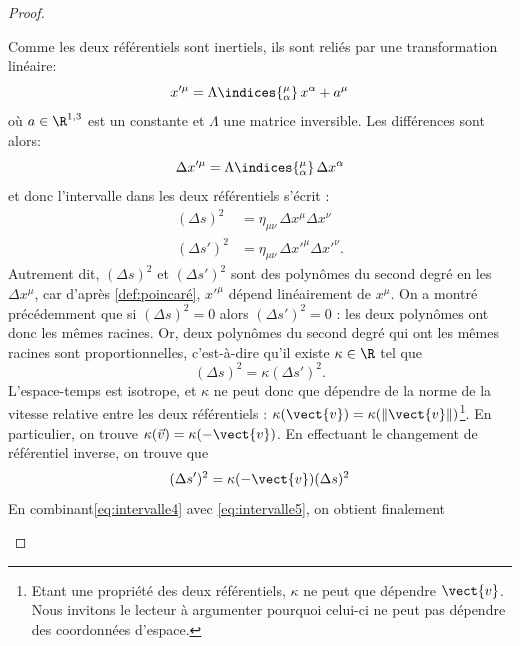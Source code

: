 {\begin{proof}
\begin{enumerate}
        Comme les deux référentiels sont inertiels, ils sont reliés par une transformation linéaire: 
        \begin{equation}
            x'^{\mu} = \Lambda\indices{^\mu_\alpha} \, x^{\alpha} + a^{\mu}
            \label{def:poincaré}
        \end{equation}
        où $a\in \R^{1,3}$ est un constante et $\Lambda$ une matrice inversible. Les différences sont alors:
        \begin{equation}
            \label{eq:intervalle1}
            \Delta x'^{\mu} = \Lambda\indices{^{\mu}_{\alpha}} \,  \Delta x^{\alpha}
        \end{equation}
        et donc l'intervalle dans les deux référentiels s'écrit : 
        \begin{align}
            \label{eq:intervalle2}
            (\Delta s)^2 & = \eta _{\mu \nu} \, \Delta x^{\mu} \Delta x^{\nu}\\
            \label{eq:intervalle3}
            (\Delta s')^2 & = \eta _{\mu \nu} \, \Delta x'^{\mu} \Delta x'^{\nu}.
        \end{align}
        Autrement dit, $(\Delta s)^2$ et $(\Delta s')^2$ sont des polynômes du second degré en les $\Delta x^{\mu}$, car d'après \ref{def:poincaré}, $x'^\mu$ dépend linéairement de $x^\mu$. On a montré précédemment que si $(\Delta s)^2 = 0$ alors $(\Delta s')^2 = 0$ : les deux polynômes ont donc les mêmes racines. Or, deux polynômes du second degré qui ont les mêmes racines sont proportionnelles, c'est-à-dire qu'il existe $\kappa\in \R$ tel que
        \begin{equation} 
            \label{eq:intervalle4}
            (\Delta s)^2 = \kappa (\Delta s')^2.
        \end{equation}
        L'espace-temps est isotrope, et $\kappa$ ne peut donc que dépendre de la norme de la vitesse relative entre les deux référentiels : $\kappa(\vect{v})=\kappa(\lVert \vect{v} \rVert)$\footnote{Etant une propriété des deux référentiels, $\kappa$ ne peut que dépendre $\vect{v}$. Nous invitons le lecteur à argumenter pourquoi celui-ci ne peut pas dépendre des coordonnées d'espace.}. En particulier, on trouve $\kappa(\Vec{v}) = \kappa(-\vect{v})$. En effectuant le changement de référentiel inverse, on trouve que
        \begin{equation}
            (\Delta s')^2 = \kappa(-\vect{v}) (\Delta s)^2
            \label{eq:intervalle5}
        \end{equation}
        En combinant\ref{eq:intervalle4} avec \ref{eq:intervalle5}, on obtient finalement

\end{enumerate}
\end{proof}}
